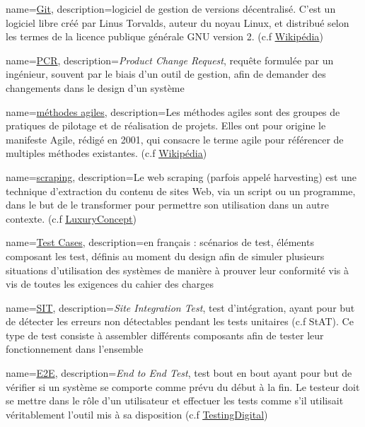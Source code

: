 {
	name=\underline{Git},
	description={logiciel de gestion de versions décentralisé. C'est un logiciel libre créé par Linus Torvalds, auteur du noyau Linux, et distribué selon les termes de la licence publique générale GNU version 2.  (c.f \underline{\href{https://fr.wikipedia.org/wiki/Git}{Wikipédia}})}
}

{
	name=\underline{PCR},
	description={\textit{Product Change Request}, requête formulée par un ingénieur, souvent par le biais d'un outil de gestion, afin de demander des changements dans le design d'un système}
}

{
	name=\underline{méthodes agiles},
	description={Les méthodes agiles sont des groupes de pratiques de pilotage et de réalisation de projets. Elles ont pour origine le manifeste Agile, rédigé en 2001, qui consacre le terme agile pour référencer de multiples méthodes existantes. (c.f \underline{\href{https://fr.wikipedia.org/wiki/Méthode_agile}{Wikipédia}})}
}

{
	name=\underline{scraping},
	description={Le web scraping (parfois appelé harvesting) est une technique d'extraction du contenu de sites Web, via un script ou un programme, dans le but de le transformer pour permettre son utilisation dans un autre contexte. (c.f \underline{\href{https://www.luxury-concept.com/dev-blog/346-le-scaping-des-donnees-pourquoi-et-comment.html}{LuxuryConcept}})}
}

{
	name=\underline{Test Cases},
	description={en français : scénarios de test, éléments composant les test, définis au moment du design afin de simuler plusieurs situations d'utilisation des systèmes de manière à prouver leur conformité vis à vis de toutes les exigences du cahier des charges}
	}

{
	name=\underline{SIT},
	description={\textit{Site Integration Test}, test d'intégration, ayant pour but de détecter les erreurs non détectables pendant les tests unitaires (c.f StAT). Ce type de test consiste à assembler différents composants afin de tester leur fonctionnement dans l'ensemble}
	}

{
	name=\underline{E2E},
	description={\textit{End to End Test}, test bout en bout ayant pour but de vérifier si un système se comporte comme prévu du début à la fin. Le testeur doit se mettre dans le rôle d’un utilisateur et effectuer les tests comme s’il utilisait véritablement l’outil mis à sa disposition (c.f \underline{\href{https://blog.testingdigital.com/quest-test-de-bout-bout-end-to-end-1288}{TestingDigital}})}
	}

